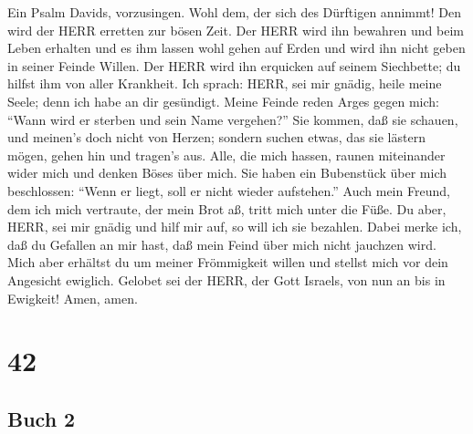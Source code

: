 Ein Psalm Davids, vorzusingen. Wohl dem, der sich des
Dürftigen annimmt! Den wird der HERR erretten zur bösen Zeit.
 Der HERR wird ihn bewahren und beim Leben erhalten und es
ihm lassen wohl gehen auf Erden und wird ihn nicht geben in seiner
Feinde Willen.  Der HERR wird ihn erquicken auf seinem
Siechbette; du hilfst ihm von aller Krankheit.  Ich sprach:
HERR, sei mir gnädig, heile meine Seele; denn ich habe an dir gesündigt.
 Meine Feinde reden Arges gegen mich: ``Wann wird er sterben
und sein Name vergehen?''  Sie kommen, daß sie schauen, und
meinen's doch nicht von Herzen; sondern suchen etwas, das sie lästern
mögen, gehen hin und tragen's aus.  Alle, die mich hassen,
raunen miteinander wider mich und denken Böses über mich. 
Sie haben ein Bubenstück über mich beschlossen: ``Wenn er liegt, soll er
nicht wieder aufstehen.''  Auch mein Freund, dem ich mich
vertraute, der mein Brot aß, tritt mich unter die Füße.  Du
aber, HERR, sei mir gnädig und hilf mir auf, so will ich sie bezahlen.
 Dabei merke ich, daß du Gefallen an mir hast, daß mein
Feind über mich nicht jauchzen wird.  Mich aber erhältst du
um meiner Frömmigkeit willen und stellst mich vor dein Angesicht
ewiglich.  Gelobet sei der HERR, der Gott Israels, von nun
an bis in Ewigkeit! Amen, amen.

\hypertarget{section-41}{%
\section{42}\label{section-41}}

\hypertarget{buch-2}{%
\subsection{Buch 2}\label{buch-2}}

